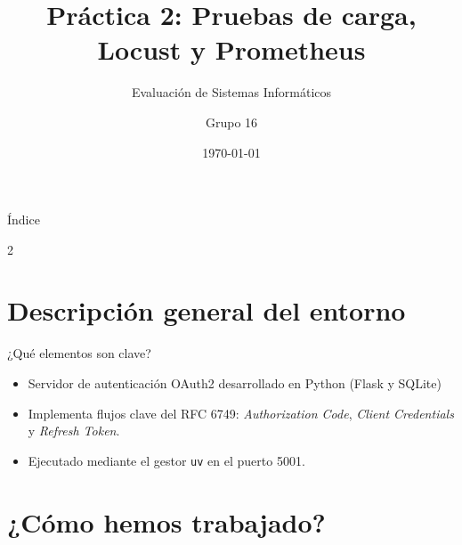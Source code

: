 \documentclass[10pt, aspectratio=169]{beamer}
\title[Práctica 2: Locust y Prometheus]{Práctica 2: Pruebas de carga, Locust y Prometheus}
\subtitle{Evaluación de Sistemas Informáticos}
\author[Grupo 16]{Grupo 16}
\date{\today}
\begin{document}
	
	\begin{frame}
		\titlepage
	\end{frame}
	
	
	\begin{frame}{Índice}
		\begin{multicols}{2}
			\tableofcontents
		\end{multicols}
	\end{frame}
	
	\section{Descripción general del entorno}
	
	\begin{frame}{¿Qué elementos son clave?}
		\begin{itemize}
			\item Servidor de autenticación OAuth2 desarrollado en Python (Flask y SQLite)
			\item Implementa flujos clave del RFC 6749: \textit{Authorization Code}, \textit{Client Credentials} y \textit{Refresh Token}.
			\item Ejecutado mediante el gestor \texttt{uv} en el puerto 5001.
		\end{itemize}
	\end{frame}
	
	\section{¿Cómo hemos trabajado?}
	
\end{document}
